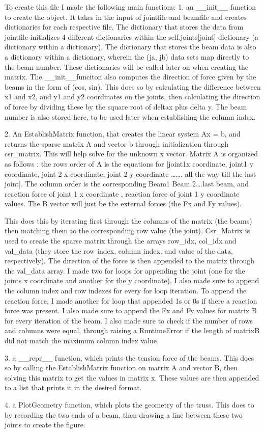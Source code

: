 To create this file I made the following main functions: 
1. an __init__ function to create the object. It takes in the input of jointfile and beamfile and creates dictionaries for each respective file. The dictionary that stores the data from jointfile initializes 4 different dictionaries within the self.joints[joint] dictionary (a dictionary within a dictionary). The dictionary that stores the beam data is also a dictionary within a dictionary, wherein the (ja, jb) data sets map directly to the beam number. These dictionaries will be called later on when creating the matrix. The __init__funciton also computes the direction of force given by the beams in the form of (cos, sin). This does so by calculating the difference between x1 and x2, and y1 and y2 coordinates on the joints, then calculating the direction of force by dividing these by the square root of deltax plus delta y. The beam number is also stored here, to be used later when establishing the column index. 

2. An EstablishMatrix function, that creates the linear system Ax = b, and returns the sparse matrix A and vector b through initialization through csr_matrix. This will help solve for the unknown x vector. Matrix A is organized as follows : the rows order of A is the equations for [joint1x coordinate, joint1 y coordinate, joint 2 x coordinate, joint 2 y coordinate ……. all the way till the last joint]. The column order is the corresponding Beam1 Beam 2….last beam, and reaction force of joint 1 x coordinate , reaction force of joint 1 y coordinate values. The B vector will just be the external forces (the Fx and Fy values). 

This does this by iterating first through the columns of the matrix (the beams) then matching them to the corresponding row value (the joint). Csr_Matrix is used to create the sparse matrix through the arrays row_idx, col_idx and val_data (they store the row index, column index, and value of the data, respectively). The direction of the force is then appended to the matrix through the val_data array. I made two for loops for appending the joint (one for the joints x coordinate and another for the y coordinate). I also made sure to append the column index and row indexes for every for loop iteration. To append the reaction force, I made another for loop that appended 1s or 0s if there a reaction force was present. I also made sure to append the Fx and Fy values for matrix B for every iteration of the beam. I also made sure to check if the number of rows and columns were equal, through raising a RuntimeError if the length of matrixB did not match the maximum column index value.

3. a __repr__ function, which prints the tension force of the beams. This does so by calling the EstablishMatrix function on matrix A and vector B, then solving this matrix to get the values in matrix x. These values are then appended to a list that prints it in the desired format. 

4. a PlotGeometry function, which plots the geometry of the truss. This does to by recording the two ends of a beam, then drawing a line between these two joints to create the figure. 
